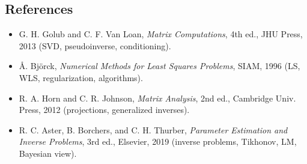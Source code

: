 \subsection*{References}
\begin{itemize}
  \item G. H. Golub and C. F. Van Loan, \emph{Matrix Computations}, 4th ed., JHU Press, 2013 (SVD, pseudoinverse, conditioning).
  \item Å. Björck, \emph{Numerical Methods for Least Squares Problems}, SIAM, 1996 (LS, WLS, regularization, algorithms).
  \item R. A. Horn and C. R. Johnson, \emph{Matrix Analysis}, 2nd ed., Cambridge Univ. Press, 2012 (projections, generalized inverses).
  \item R. C. Aster, B. Borchers, and C. H. Thurber, \emph{Parameter Estimation and Inverse Problems}, 3rd ed., Elsevier, 2019 (inverse problems, Tikhonov, LM, Bayesian view).
\end{itemize}
